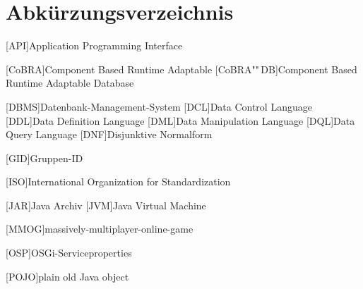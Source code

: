 \chapter*{Abkürzungsverzeichnis}

\vspace{\topskip}


\begin{acronym}[xxxxxxxxxxxx]
	\setlength{\itemsep}{-\parsep}
	\setlength{\itemindent}{1.5em}
	[API]{Application Programming Interface}

	\vspace{\parsep} 
	[\mbox{CoBRA}]{Com\-po\-nent Based Run\-time Adapt\-able}
	[\mbox{CoBRA}""\,DB]{Com\-po\-nent Based Run\-time Adapt\-able Database}

	\vspace{\parsep}
	[DBMS]{Datenbank-Management-System}
	[DCL]{Data Control Language}
	[DDL]{Data Definition Language}
	[DML]{Data Manipulation Language}
	[DQL]{Data Query Language}
	[DNF]{Disjunktive Normalform}


	\vspace{\parsep}
	[GID]{Gruppen-ID}



	[ISO]{International Organization for Standardization}
	
	\vspace{\parsep}
	[JAR]{Java Archiv}
	[JVM]{Java Virtual Machine}
	


	\vspace{\parsep}
	[MMOG]{massively-multiplayer-online-game}


	\vspace{\parsep}
	[OSP]{OSGi-Serviceproperties}
	
	[POJO]{plain old Java object}


\end{acronym}
